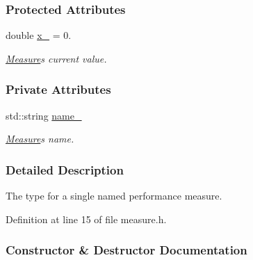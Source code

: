 \subsubsection*{Protected Attributes}
\begin{DoxyCompactItemize}
\item 
double \hyperlink{structslb_1_1core_1_1util_1_1Measure_a6dbbbb64769e439b9f99ef71563698a1}{x\+\_\+} = 0.\hypertarget{structslb_1_1core_1_1util_1_1Measure_a6dbbbb64769e439b9f99ef71563698a1}{}\label{structslb_1_1core_1_1util_1_1Measure_a6dbbbb64769e439b9f99ef71563698a1}

\begin{DoxyCompactList}\small\item\em \hyperlink{structslb_1_1core_1_1util_1_1Measure}{Measure}\textquotesingle{}s current value. \end{DoxyCompactList}\end{DoxyCompactItemize}
\subsubsection*{Private Attributes}
\begin{DoxyCompactItemize}
\item 
std\+::string \hyperlink{structslb_1_1core_1_1util_1_1Measure_a11a556eabcad0982d687224e283b51f8}{name\+\_\+}\hypertarget{structslb_1_1core_1_1util_1_1Measure_a11a556eabcad0982d687224e283b51f8}{}\label{structslb_1_1core_1_1util_1_1Measure_a11a556eabcad0982d687224e283b51f8}

\begin{DoxyCompactList}\small\item\em \hyperlink{structslb_1_1core_1_1util_1_1Measure}{Measure}\textquotesingle{}s name. \end{DoxyCompactList}\end{DoxyCompactItemize}


\subsubsection{Detailed Description}
The type for a single named performance measure. 

Definition at line 15 of file measure.\+h.



\subsubsection{Constructor \& Destructor Documentation}
